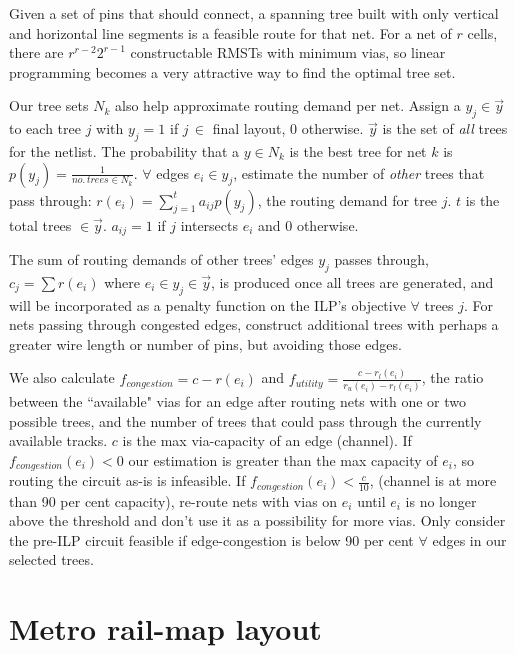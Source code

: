 \documentclass[twocolumn]{article}
\begin{document}
Given a set of pins that should connect, a spanning tree\cite{Sherwani} built with only vertical
and horizontal line segments is a feasible route for that net.
For a net of $r$ cells, there are $r^{r-2}2^{r-1}$ constructable RMSTs with minimum vias,
so linear programming becomes a very attractive way to find the optimal tree set.

Our tree sets $N_k$ also help approximate routing demand per net.
Assign a $y_j \in \vec{y}$ to each tree $j$ with $y_j = 1$ if $j \, \in$ final layout,
0 otherwise. $\vec{y}$ is the set of \textit{all} trees for the netlist.
The probability that a $y \in N_k$ is the best tree for net $k$ is
$p(y_j) = \frac{1}{no. \, trees \in N_k}$. $\forall$ edges $e_i \in y_j$,
estimate the number of \textit{other} trees that pass through:
$r(e_i) = \sum\limits^{t}_{j=1}a_{ij}p(y_j)$, the routing demand for tree $j$.
$t$ is the total trees $\in \vec{y}$. $a_{ij} = 1$ if $j$ intersects $e_i$ and 0 otherwise.

The sum of routing demands of other trees' edges $y_j$ passes through, $c_j = \sum r(e_i)$ where $e_i \in y_j \in \vec{y}$, is produced once all trees are generated, and will be incorporated as a
penalty function on the ILP's objective $\forall$ trees $j$. For nets passing through congested edges,
construct additional trees with perhaps a greater wire length or number of pins, but avoiding those edges.

We also calculate $f_{congestion} = c - r(e_i)$ and
$f_{utility} = \frac{c - r_{l}(e_i)}{r_{u}(e_i) - r_{l}(e_i)}$,
the ratio between the ``available" vias for an edge after routing nets with
one or two possible trees, and the number of trees that could pass through the
currently available tracks. $c$ is the max via-capacity of an edge (channel).
If $f_{congestion}(e_i) < 0$ our estimation is greater than the max capacity of $e_i$, so routing
the circuit as-is is infeasible.
If $f_{congestion}(e_i) < \frac{c}{10}$, (channel is at more than 90 per cent
capacity), re-route nets with vias on $e_i$
until $e_i$ is no longer above the threshold and don't use it as a possibility
for more vias. Only consider the pre-ILP circuit feasible if edge-congestion is below
90 per cent $\forall$ edges in our selected trees.

\section*{Metro rail-map layout}
\end{document}
